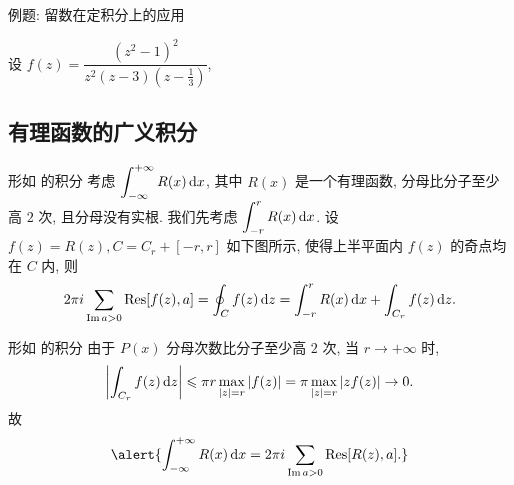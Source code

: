 \begin{frame}{例题: 留数在定积分上的应用}
	\onslide<+->
	\begin{solutionc}
		设 $f(z)=\dfrac{(z^2-1)^2}{z^2(z-3)(z-\frac13)}$,
		\onslide<+->{则
			\[\Res[f(z),0]=\frac{10}3,\quad\Res[f(z),\frac13]=-\frac83,\]
		}
		\vspace{-\baselineskip}
		\onslide<+->{
			\begin{align*}
				\int_0^{2\pi}\frac{\sin^2\theta}{5-3\cos\theta}\diff\theta
				&=-\frac i6\cdot 2\pi i\Bigl[\Res[f(z),0]+\Res[f(z),\frac13]\Bigr]\\
				&=\frac{2\pi}9.
			\end{align*}
		}
		\vspace{-\baselineskip}
	\end{solutionc}
\end{frame}

\subsection{有理函数的广义积分}

\begin{frame}{形如  的积分}
	\onslide<+->
	考虑 $\displaystyle\int_{-\infty}^{+\infty}R(x)\,\mathrm{d} x$, 其中 $R(x)$ 是一个有理函数, 分母比分子至少高 $2$ 次, 且分母没有实根.
	\onslide<+->
	我们先考虑 $\displaystyle\int_{-r}^rR(x)\,\mathrm{d} x$.
	\onslide<+->
	设 $f(z)=R(z),C=C_r+[-r,r]$ 如下图所示, 使得上半平面内 $f(z)$ 的奇点均在 $C$ 内,
	\onslide<+->
	则
	\[2\pi i\sum_{\operatorname{Im} a>0}{\mathrm{Res}}[f(z),a]=\oint_Cf(z)\,\mathrm{d} z=\int_{-r}^rR(x)\,\mathrm{d} x+\int_{C_r}f(z)\,\mathrm{d} z.\]
	\onslide<3->
	\begin{center}
	\end{center}
\end{frame}


\begin{frame}{形如  的积分}
	\onslide<+->
	由于 $P(x)$ 分母次数比分子至少高 $2$ 次,
	\onslide<+->
	当 $r\to+\infty$ 时,
	\[\left|\int_{C_r}f(z)\,\mathrm{d} z\right|\leqslant \pi r\max_{|z|=r}|f(z)|
	=\pi \max_{|z|=r}|zf(z)|\to 0.\]
	\onslide<+->
	故
	\[\alert{\int_{-\infty}^{+\infty}R(x)\diff x=2\pi i\sum_{\Im a>0}\Res[R(z),a].}\]
\end{frame}


